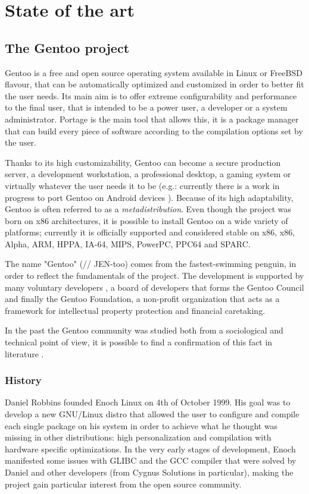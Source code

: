 \chapter{State of the art}

\section{The Gentoo project}
Gentoo is a free and open source operating system available in Linux or FreeBSD flavour, that can be automatically optimized and customized in order to better fit the user needs. Its main aim is to offer extreme configurability and performance to the final user, that is intended to be a power user, a developer or a system administrator. Portage is the main tool that allows this, it is a package manager that can build every piece of software according to the compilation options set by the user.

Thanks to its high customizability, Gentoo can become a secure production server, a development workstation, a professional desktop, a gaming system or virtually whatever the user needs it to be (e.g.: currently there is a work in progress to port Gentoo on Android devices  \cite{gentoo_android}). Because of its high adaptability, Gentoo is often referred to as a \emph{metadistribution}.
Even though the project was born on x86 architectures, it is possible to install Gentoo on a wide variety of platforms; currently it is officially supported and considered stable on x86, x86, Alpha, ARM, HPPA, IA-64, MIPS, PowerPC, PPC64 and SPARC.

The name "Gentoo" (// JEN-too) comes from the fastest-swimming penguin, in order to reflect the fundamentals of the project.
The development is supported by many voluntary developers \cite{gentoo_developers}, a board of developers that forms the Gentoo Council and finally the Gentoo Foundation, a non-profit organization that acts as a framework for intellectual property protection and financial caretaking.

In the past the Gentoo community was studied both from a sociological and technical point of view, it is possible to find a confirmation of this fact in literature \cite{gentoo_book} \cite{gentoo_rise} \cite{gentoo_distributed} \cite{gentoo_ng}.


\subsection{History}
Daniel Robbins founded Enoch Linux on 4th of October 1999. His goal was to develop a new GNU/Linux distro that allowed the user to configure and compile each single package on his system in order to achieve what he thought was missing in other distributions: high personalization and compilation with hardware specific optimizations.
In the very early stages of development, Enoch manifested some issues with GLIBC and the GCC compiler that were solved by Daniel and other developers (from Cygnus Solutions in particular), making the project gain particular interest from the open source community.

